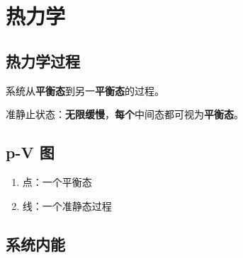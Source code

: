 \chapter{热力学}

\newpage

\section{热力学过程}

系统从\textbf{平衡态}到另一\textbf{平衡态}的过程。

准静止状态：\textbf{无限缓慢}，\textbf{每个}中间态都可视为\textbf{平衡态}。

\section{p-V 图}

\begin{enumerate}
    \item 点：一个平衡态
    \item 线：一个准静态过程
\end{enumerate}

\section{系统内能}

